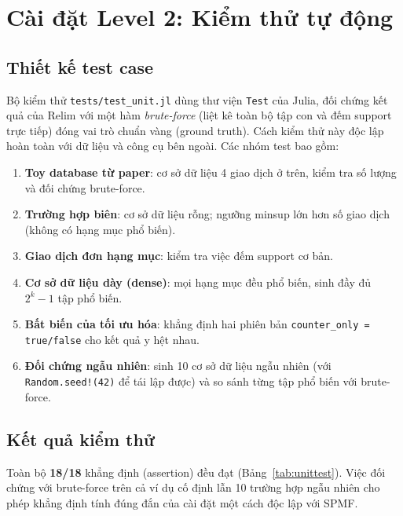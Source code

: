 \documentclass[12pt,a4paper]{report}
\begin{document}
\section{Cài đặt Level 2: Kiểm thử tự động}

\subsection{Thiết kế test case}

Bộ kiểm thử \texttt{tests/test\_unit.jl} dùng thư viện \texttt{Test} của
Julia, đối chứng kết quả của Relim với một hàm \emph{brute-force} (liệt kê toàn
bộ tập con và đếm support trực tiếp) đóng vai trò chuẩn vàng (ground truth). Cách
kiểm thử này độc lập hoàn toàn với dữ liệu và công cụ bên ngoài. Các
nhóm test bao gồm:

\begin{enumerate}[label=(\arabic*)]
    \item \textbf{Toy database từ paper}: cơ sở dữ liệu 4 giao dịch ở trên,
    kiểm tra số lượng và đối chứng brute-force.
    \item \textbf{Trường hợp biên}: cơ sở dữ liệu rỗng; ngưỡng minsup lớn hơn
    số giao dịch (không có hạng mục phổ biến).
    \item \textbf{Giao dịch đơn hạng mục}: kiểm tra việc đếm support cơ bản.
    \item \textbf{Cơ sở dữ liệu dày (dense)}: mọi hạng mục đều phổ biến, sinh
    đầy đủ $2^k - 1$ tập phổ biến.
    \item \textbf{Bất biến của tối ưu hóa}: khẳng định hai phiên bản
    \texttt{counter\_only = true/false} cho kết quả y hệt nhau.
    \item \textbf{Đối chứng ngẫu nhiên}: sinh 10 cơ sở dữ liệu ngẫu nhiên (với
    \texttt{Random.seed!(42)} để tái lập được) và so sánh từng tập phổ biến với
    brute-force.
\end{enumerate}

\subsection{Kết quả kiểm thử}

Toàn bộ \textbf{18/18} khẳng định (assertion) đều đạt
(Bảng~\ref{tab:unittest}). Việc đối chứng với brute-force trên cả ví dụ cố định
lẫn 10 trường hợp ngẫu nhiên cho phép khẳng định tính đúng đắn của cài đặt một
cách độc lập với SPMF.
\end{document}
